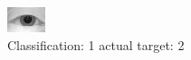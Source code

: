 \begin{figure}[h!]
\begin{center}
\includegraphics[width=0.60\columnwidth]{figures/ID1017_class_1_target_2.png}
\end{center}
\caption{ Classification: 1 actual target: 2}
\label{fig:ID1017_class_1_target_2}
\end{figure}
